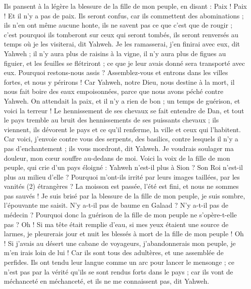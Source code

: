 \begin{multicols}{2}
Ils pansent à la légère la blessure de la fille de mon peuple, en disant : Paix ! Paix ! Et il n'y a pas de paix.
Ils seront confus, car ils commettent des abominations ; ils n'en ont même aucune honte, ils ne savent pas ce que c'est que de rougir ; c'est pourquoi ils tomberont sur ceux qui seront tombés, ils seront renversés au temps où je les visiterai, dit Yahweh.
Je les ramasserai, j'en finirai avec eux, dit Yahweh ; il n'y aura plus de raisins à la vigne, il n'y aura plus de figues au figuier, et les feuilles se flétriront ; ce que je leur avais donné sera transporté avec eux.
Pourquoi restons-nous assis ? Assemblez-vous et entrons dans les villes fortes, et nous y périrons ! Car Yahweh, notre Dieu, nous destine à la mort, il nous fait boire des eaux empoisonnées, parce que nous avons péché contre Yahweh.
On attendait la paix, et il n'y a rien de bon ; un temps de guérison, et voici la terreur !
Le hennissement de ses chevaux se fait entendre de Dan, et tout le pays tremble au bruit des hennissements de ses puissants chevaux ; ils viennent, ils dévorent le pays et ce qu'il renferme, la ville et ceux qui l'habitent.
Car voici, j'envoie contre vous des serpents, des basilics, contre lesquels il n'y a pas d'enchantement ; ils vous mordront, dit Yahweh.
Je voudrais soulager ma douleur, mon cœur souffre au-dedans de moi.
Voici la voix de la fille de mon peuple, qui crie d'un pays éloigné : Yahweh n'est-il plus à Sion ? Son Roi n'est-il plus au milieu d'elle ? Pourquoi m'ont-ils irrité par leurs images taillées, par les vanités (2) étrangères ?
La moisson est passée, l'été est fini, et nous ne sommes pas sauvés !
Je suis brisé par la blessure de la fille de mon peuple, je suis sombre, l'épouvante me saisit.
N'y a-t-il pas de baume en Galaad ? N'y a-t-il pas de médecin ? Pourquoi donc la guérison de la fille de mon peuple ne s'opère-t-elle pas ?
\VerseOne{}Oh ! Si ma tête était remplie d'eau, si mes yeux étaient une source de larmes, je pleurerais jour et nuit les blessés à mort de la fille de mon peuple !
Oh ! Si j'avais au désert une cabane de voyageurs, j'abandonnerais mon peuple, je m'en irais loin de lui ! Car ils sont tous des adultères, et une assemblée de perfides.
Ils ont tendu leur langue comme un arc pour lancer le mensonge ; ce n'est pas par la vérité qu'ils se sont rendus forts dans le pays ; car ils vont de méchanceté en méchanceté, et ils ne me connaissent pas, dit Yahweh.

\end{multicols}
